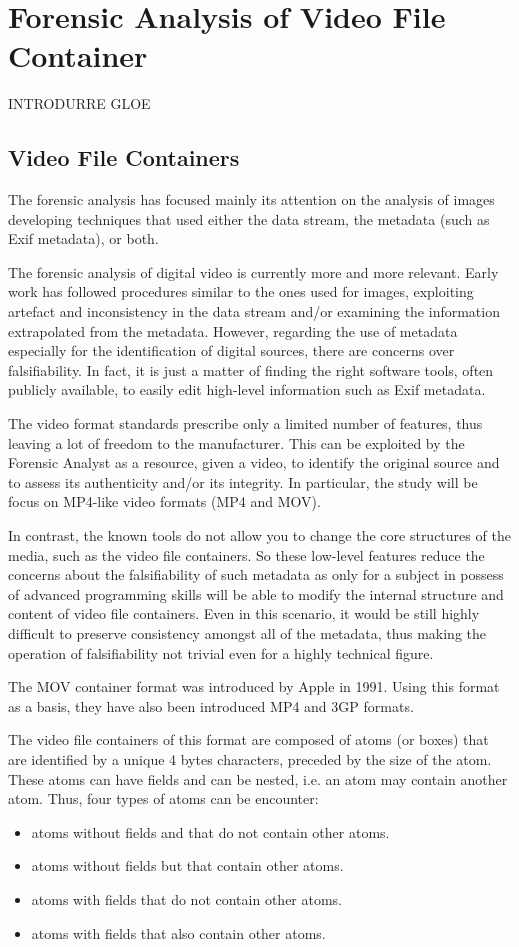 \section{Forensic Analysis of Video File Container}

{INTRODURRE GLOE}

\subsection{Video File Containers}

The forensic analysis has focused mainly its attention on the analysis of images developing techniques that used either the data stream, the metadata (such as Exif metadata), or both.

The forensic analysis of digital video is currently more and more relevant. Early work has followed procedures similar to the ones used for images, exploiting artefact and inconsistency in the data stream and/or examining the information extrapolated from the metadata.
However, regarding the use of metadata especially for the identification of digital sources, there are concerns over falsifiability. In fact, it is just a matter of finding the right software tools, often publicly available, to easily edit high-level information such as Exif metadata.

The video format standards prescribe only a limited number of features, thus leaving a lot of freedom to the manufacturer. This can be exploited by the Forensic Analyst as a resource, given a video, to identify the original source and to assess its authenticity and/or its integrity. In particular, the study will be focus on MP4-like video formats (MP4 and MOV).

In contrast, the known tools do not allow you to change the core structures of the media, such as the video file containers. So these low-level features reduce the concerns about the falsifiability of such metadata as only for a subject in possess of advanced programming skills will be able to modify the internal structure and content of video file containers. Even in this scenario, it would be still highly difficult to preserve consistency amongst all of the metadata, thus making the operation of falsifiability not trivial even for a highly technical figure.

The MOV container format was introduced by Apple in 1991. Using this format as a basis, they have also been introduced MP4 and 3GP formats.

The video file containers of this format are composed of atoms (or boxes) that are identified by a unique 4 bytes characters, preceded by the size of the atom. These atoms can have fields and can be nested, i.e. an atom may contain another atom. Thus, four types of atoms can be encounter:
\begin{itemize}
\item atoms without fields and that do not contain other atoms.
\item atoms without fields but that contain other atoms.
\item atoms with fields that do not contain other atoms.
\item atoms with fields that also contain other atoms.
\end{itemize}

